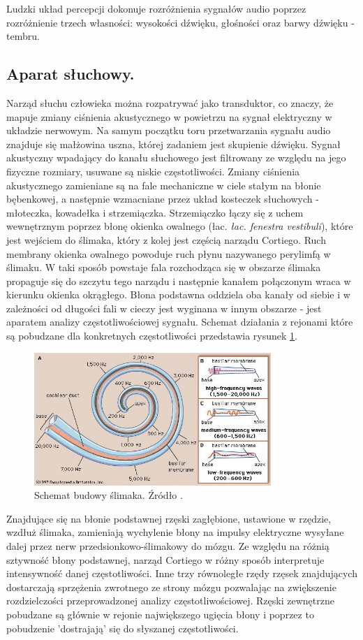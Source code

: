 Ludzki układ percepcji dokonuje rozróżnienia sygnałów audio poprzez rozróżnienie trzech własności: wysokości dźwięku, głośności oraz barwy dźwięku - tembru. 

\subsection{Aparat słuchowy.}
Narząd słuchu człowieka można rozpatrywać jako transduktor, co znaczy, że mapuje zmiany ciśnienia akustycznego w powietrzu na sygnał elektryczny w układzie nerwowym. Na samym początku toru przetwarzania sygnału audio znajduje się małżowina uszna, której zadaniem jest skupienie dźwięku. Sygnał akustyczny wpadający do kanału słuchowego jest filtrowany ze względu na jego fizyczne rozmiary, usuwane są niskie częstotliwości. Zmiany ciśnienia akustycznego zamieniane są na fale mechaniczne w ciele stałym na błonie bębenkowej, a następnie wzmacniane przez układ kosteczek słuchowych - młoteczka, kowadełka i strzemiączka. Strzemiączko łączy się z uchem wewnętrznym poprzez błonę okienka owalnego (łac. \textit{łac. fenestra vestibuli}), które jest wejściem do ślimaka, który z kolej jest częścią narządu Cortiego. Ruch membrany okienka owalnego powoduje ruch płynu nazywanego perylimfą w ślimaku. W taki sposób powstaje fala rozchodząca się w obszarze ślimaka propaguje się do szczytu tego narządu i następnie kanałem połączonym wraca w kierunku okienka okrągłego. Błona podstawna oddziela oba kanały od siebie i w zależności od długości fali w cieczy jest wyginana w innym obszarze - jest aparatem analizy częstotliwościowej sygnału. Schemat działania z rejonami które są pobudzane dla konkretnych częstotliwości przedstawia rysunek \ref{fig:ucho}.
\begin{figure}[ht!]
  \centering
    \includegraphics[width=0.8\textwidth]{./ucho.jpg}
    \caption{\label{fig:ucho} Schemat budowy ślimaka. Źródło \cite{enciclopidiabritanica}.}
\end{figure}
Znajdujące się na błonie podstawnej rzęski zagłębione, ustawione w rzędzie, wzdłuż ślimaka, zamieniają wychylenie błony na impulsy elektryczne wysyłane dalej przez nerw przedsionkowo-ślimakowy do mózgu. Ze względu na różnią sztywność błony podstawnej, narząd Cortiego w różny sposób interpretuje intensywność danej częstotliwości. Inne trzy równoległe rzędy rzęsek znajdujących dostarczają sprzężenia zwrotnego ze strony mózgu pozwalając na zwiększenie rozdzielczości przeprowadzonej analizy częstotliwościowej. Rzęski zewnętrzne pobudzane są głównie w rejonie największego ugięcia błony i poprzez to pobudzenie 'dostrajają' się do słyszanej częstotliwości.

